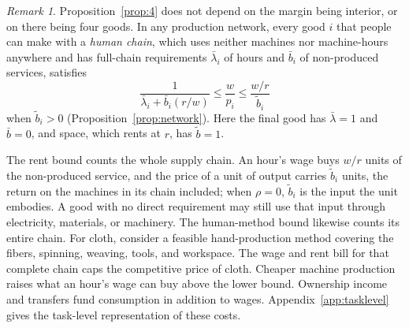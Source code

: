 \documentclass[12pt]{article}
\theoremstyle{plain}
\theoremstyle{definition}
\theoremstyle{remark}
\newtheorem*{remark}{Remark}
\begin{document}
\begin{remark}
Proposition~\ref{prop:4} does not depend on the margin being interior, or on there being four goods. In any production network, every good $i$ that people can make with a \emph{human chain}, which uses neither machines nor machine-hours anywhere and has full-chain requirements $\bar\lambda_i$ of hours and $\bar b_i$ of non-produced services, satisfies
\begin{equation}\label{eq:13}
\frac{1}{\bar\lambda_i+\bar b_i(r/w)}
\le\frac{w}{p_i}
\le\frac{w/r}{\widetilde b_i}
\end{equation}
when $\widetilde b_i>0$ (Proposition~\ref{prop:network}). Here the final good has $\bar\lambda=1$ and $\bar b=0$, and space, which rents at $r$, has $\widetilde b=1$.
\end{remark}

The rent bound counts the whole supply chain. An hour's wage buys $w/r$ units of the non-produced service, and the price of a unit of output carries $\widetilde b_i$ units, the return on the machines in its chain included; when $\rho=0$, $\widetilde b_i$ is the input the unit embodies. A good with no direct requirement may still use that input through electricity, materials, or machinery. The human-method bound likewise counts its entire chain. For cloth, consider a feasible hand-production method covering the fibers, spinning, weaving, tools, and workspace. The wage and rent bill for that complete chain caps the competitive price of cloth. Cheaper machine production raises what an hour's wage can buy above the lower bound. Ownership income and transfers fund consumption in addition to wages. Appendix~\ref{app:tasklevel} gives the task-level representation of these costs.
\end{document}
